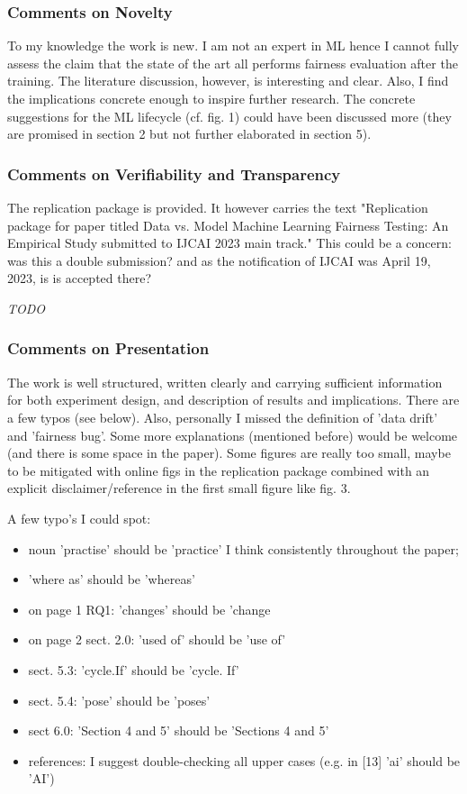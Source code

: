 \documentclass[conference,review,anonymous]{IEEEtran}
\newcommand{\highlight}[1]{\begin{framed}%
  \noindent\emph{#1}
\end{framed}}
\begin{document}
\subsubsection{Comments on Novelty}
To my knowledge the work is new. I am not an expert in ML hence
I cannot fully assess the claim that the state of the art all performs
fairness evaluation after the training. The literature discussion,
however, is interesting and clear. Also, I find the implications
concrete enough to inspire further research. The concrete suggestions
for the ML lifecycle (cf. fig. 1) could have been discussed more (they
are promised in section 2 but not further elaborated in section 5).

\subsubsection{Comments on Verifiability and Transparency}
The replication package is provided. It however carries the text
"Replication package for paper titled Data vs. Model Machine Learning
Fairness Testing: An Empirical Study submitted to IJCAI 2023 main
track." This could be a concern: was this a double submission? and as
the notification of IJCAI was April 19, 2023, is is accepted there?

\highlight{TODO}

\subsubsection{Comments on Presentation}

The work is well structured, written clearly and carrying sufficient
information for both experiment design, and description of results and
implications. There are a few typos (see below). Also, personally
I missed the definition of 'data drift' and 'fairness bug'. Some more
explanations (mentioned before) would be welcome (and there is some
space in the paper). Some figures are really too small, maybe to be
mitigated with online figs in the replication package combined with an
explicit disclaimer/reference in the first small figure like fig. 3.

A few typo's I could spot:
\begin{itemize}
  \item noun 'practise' should be 'practice' I think consistently throughout the paper;
  \item 'where as' should be 'whereas'
  \item on page 1 RQ1: 'changes' should be 'change
  \item on page 2 sect. 2.0: 'used of' should be 'use of'
  \item sect. 5.3: 'cycle.If' should be 'cycle. If'
  \item sect. 5.4: 'pose' should be 'poses'
  \item sect 6.0: 'Section 4 and 5' should be 'Sections 4 and 5'
  \item references: I suggest double-checking all upper cases (e.g. in
    [13] 'ai' should be 'AI')
\end{itemize}
\end{document}
